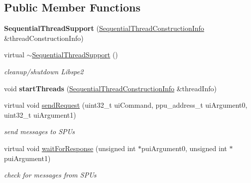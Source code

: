 \subsection*{Public Member Functions}
\begin{DoxyCompactItemize}
\item 
\mbox{\label{classSequentialThreadSupport_aee73c0902e906141dc87c918f61b51f1}} 
{\bfseries Sequential\+Thread\+Support} (\hyperlink{structSequentialThreadSupport_1_1SequentialThreadConstructionInfo}{Sequential\+Thread\+Construction\+Info} \&thread\+Construction\+Info)
\item 
\mbox{\label{classSequentialThreadSupport_a2214755af73483efa34eb8e901ac9a4d}} 
virtual \hyperlink{classSequentialThreadSupport_a2214755af73483efa34eb8e901ac9a4d}{$\sim$\+Sequential\+Thread\+Support} ()
\begin{DoxyCompactList}\small\item\em cleanup/shutdown Libspe2 \end{DoxyCompactList}\item 
\mbox{\label{classSequentialThreadSupport_a4fe5adac8ee34615c275544aef46de4a}} 
void {\bfseries start\+Threads} (\hyperlink{structSequentialThreadSupport_1_1SequentialThreadConstructionInfo}{Sequential\+Thread\+Construction\+Info} \&thread\+Info)
\item 
virtual void \hyperlink{classSequentialThreadSupport_ab407174572a6ffe7c00fdbf096dd4f29}{send\+Request} (uint32\+\_\+t ui\+Command, ppu\+\_\+address\+\_\+t ui\+Argument0, uint32\+\_\+t ui\+Argument1)
\begin{DoxyCompactList}\small\item\em send messages to S\+P\+Us \end{DoxyCompactList}\item 
\mbox{\label{classSequentialThreadSupport_a2db51a427f789c6c489e1250722c7088}} 
virtual void \hyperlink{classSequentialThreadSupport_a2db51a427f789c6c489e1250722c7088}{wait\+For\+Response} (unsigned int $\ast$pui\+Argument0, unsigned int $\ast$pui\+Argument1)
\begin{DoxyCompactList}\small\item\em check for messages from S\+P\+Us \end{DoxyCompactList}\item 

\end{DoxyCompactItemize}

